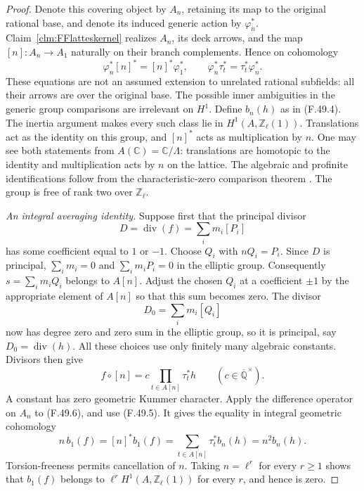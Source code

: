 \documentclass[11pt]{article}
\begin{document}
\begin{proof}
Denote this covering object by \(A_n\), retaining
its map to the original rational base, and denote
its induced generic action by \(\varphi_n^*\).
Claim~\ref{clm:FFlatteskernel} realizes \(A_n\),
its deck arrows, and the map
\([n]:A_n\to A_1\) naturally on their branch
complements. Hence on cohomology
\[
 \varphi_n^*[n]^*=[n]^*\varphi_1^*,\qquad
 \varphi_n^*\tau_t^*=\tau_t^*\varphi_n^*.
                                                        \tag{F.49.5}
\]
These equations are not an assumed extension to
unrelated rational subfields: all their arrows are
over the original base. The possible inner
ambiguities in the generic group comparisons are
irrelevant on \(H^1\).
Define \(b_n(h)\) as in (F.49.4). The inertia
argument makes every such class lie in
\(H^1(A,\mathbb Z_\ell(1))\).
Translations act as the identity on this group,
and \([n]^*\) acts as multiplication by \(n\).
One may see both statements from
\(A(\mathbb C)=\mathbb C/\Lambda\): translations
are homotopic to the identity and multiplication
acts by \(n\) on the lattice. The algebraic and
profinite identifications follow from the
characteristic-zero comparison theorem
\citep[Expose~XII, Theoreme~5.1]{FF_SGA1}.
The group is free of rank two over \(\mathbb Z_\ell\).

\emph{An integral averaging identity.}
Suppose first that the principal divisor
\[
                       D=\operatorname{div}(f)
                              =\sum_i m_i[P_i]
\]
has some coefficient equal to \(1\) or \(-1\).
Choose \(Q_i\) with \(nQ_i=P_i\). Since \(D\)
is principal, \(\sum_i m_i=0\) and
\(\sum_i m_iP_i=0\) in the elliptic group.
Consequently \(s=\sum_i m_iQ_i\) belongs to
\(A[n]\). Adjust the chosen \(Q_i\) at a
coefficient \(\pm1\) by the appropriate element
of \(A[n]\) so that this sum becomes zero.
The divisor
\[
                         D_0=\sum_i m_i[Q_i]
\]
now has degree zero and zero sum in the elliptic
group, so it is principal, say
\(D_0=\operatorname{div}(h)\).
All these choices use only finitely many algebraic
constants. Divisors then give
\[
          f\circ[n]=c\prod_{t\in A[n]}\tau_t^*h
                  \qquad(c\in\overline{\mathbb Q}^{\times}).
                                                        \tag{F.49.6}
\]
A constant has zero geometric Kummer character.
Apply the difference operator on \(A_n\) to
(F.49.6), and use (F.49.5). It gives the equality
in integral geometric cohomology
\[
           n\,b_1(f)
              =[n]^*b_1(f)
              =\sum_{t\in A[n]}\tau_t^*b_n(h)
              =n^2b_n(h).
                                                        \tag{F.49.7}
\]
Torsion-freeness permits cancellation of \(n\).
Taking \(n=\ell^r\) for every \(r\ge1\) shows
that \(b_1(f)\) belongs to
\(\ell^r H^1(A,\mathbb Z_\ell(1))\) for every
\(r\), and hence is zero.


\end{proof}
\end{document}

